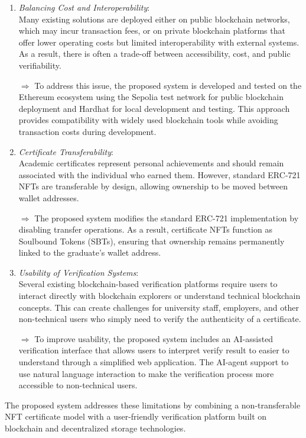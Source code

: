 \begin{enumerate}
      \item \textit{Balancing Cost and Interoperability}:\\
            Many existing solutions are deployed either on public blockchain networks, which may incur transaction fees, or on private blockchain platforms that offer lower operating costs but limited interoperability with external systems. As a result, there is often a trade-off between accessibility, cost, and public verifiability.

            $\Rightarrow$ To address this issue, the proposed system is developed and tested on the Ethereum ecosystem using the Sepolia test network for public blockchain deployment and Hardhat for local development and testing. This approach provides compatibility with widely used blockchain tools while avoiding transaction costs during development.

      \item \textit{Certificate Transferability}:\\
            Academic certificates represent personal achievements and should remain associated with the individual who earned them. However, standard ERC-721 NFTs are transferable by design, allowing ownership to be moved between wallet addresses.

            $\Rightarrow$ The proposed system modifies the standard ERC-721 implementation by disabling transfer operations. As a result, certificate NFTs function as Soulbound Tokens (SBTs), ensuring that ownership remains permanently linked to the graduate's wallet address.

      \item \textit{Usability of Verification Systems}:\\
            Several existing blockchain-based verification platforms require users to interact directly with blockchain explorers or understand technical blockchain concepts. This can create challenges for university staff, employers, and other non-technical users who simply need to verify the authenticity of a certificate.

            $\Rightarrow$ To improve usability, the proposed system includes an AI-assisted verification interface that allows users to interpret verify result to easier to understand through a simplified web application. The AI-agent support to use natural language interaction to make the verification process more accessible to non-technical users.
\end{enumerate}

The proposed system addresses these limitations by combining a non-transferable NFT certificate model with a user-friendly verification platform built on blockchain and decentralized storage technologies.